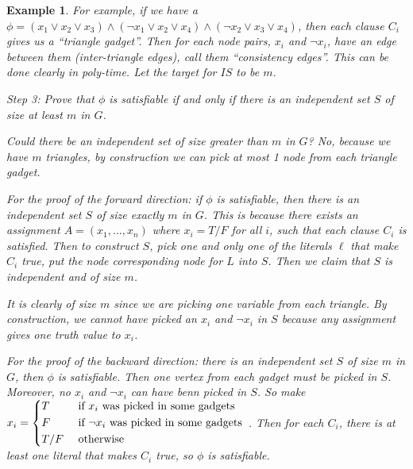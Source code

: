 \documentclass[twoside]{article}
\newtheorem{protoexample}[prototheorem]{Example}
\newenvironment{example}
{\colorlet{shadecolor}{red!15}\begin{shaded}\begin{protoexample}\normalfont}
		{\end{protoexample}\end{shaded}}
\begin{document}
\begin{example}
	For example, if we have a $\phi = (x_1 \lor x_2 \lor x_3) \land (\neg x_1 \lor x_2 \lor x_4) \land (\neg x_2 \lor x_3 \lor x_4)$, then each clause $C_i$ gives us a ``triangle gadget''. Then for each node pairs, $x_i$ and $\neg x_i$, have an edge between them (inter-triangle edges), call them ``consistency edges''. This can be done clearly in poly-time. Let the target for $IS$ to be $m$. 
		
	Step 3: Prove that $\phi$ is satisfiable if and only if there is an independent set $S$ of size at least $m$ in $G$. 
		
	Could there be an independent set of size greater than $m$ in $G$? No, because we have $m$ triangles, by construction we can pick at most 1 node from each triangle gadget. 
		
	For the proof of the forward direction: if $\phi$ is satisfiable, then there is an independent set $S$ of size exactly $m$ in $G$. This is because there exists an assignment $A = (x_1, ..., x_n)$ where $x_i = T/F$ for all $i$, such that each clause $C_i$ is satisfied. Then to construct $S$, pick one and only one of the literals $\ell$ that make $C_i$ true, put the node corresponding node for $L$ into $S$. Then we claim that $S$ is independent and of size $m$. 
		
	It is clearly of size $m$ since we are picking one variable from each triangle. By construction, we cannot have picked an $x_i$ and $\neg x_i$ in $S$ because any assignment gives one truth value to $x_i$. 
		
	For the proof of the backward direction: there is an independent set $S$ of size $m$ in $G$, then $\phi$ is satisfiable. Then one vertex from each gadget must be picked in $S$. Moreover, no $x_i$ and $\neg x_i$ can have benn picked in $S$. So make $x_i = \begin{dcases}
	T &\text{ if } x_i \text{ was picked in some gadgets }\\
	F &\text{ if } \neg x_i \text{ was picked in some gadgets }\\
	T/F &\text{ otherwise}
	\end{dcases}
	$. Then for each $C_i$, there is at least one literal that makes $C_i$ true, so $\phi$ is satisfiable. 
\end{example}
\end{document}
